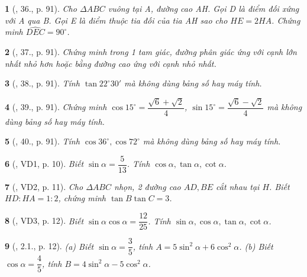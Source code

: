 \documentclass{article}
\newtheorem{baitoan}{}
\begin{document}
\begin{baitoan}[\cite{Binh_Toan_9_tap_1}, 36., p. 91]
	Cho $\Delta ABC$ vuông tại A, đường cao AH. Gọi D là điểm đối xứng với A qua B. Gọi E là điểm thuộc tia đối của tia AH sao cho $HE = 2HA$. Chứng minh $\widehat{DEC} = 90^\circ$.
\end{baitoan}

\begin{baitoan}[\cite{Binh_Toan_9_tap_1}, 37., p. 91]
	Chứng minh trong 1 tam giác, đường phân giác ứng với cạnh lớn nhất nhỏ hơn hoặc bằng đường cao ứng với cạnh nhỏ nhất.
\end{baitoan}

\begin{baitoan}[\cite{Binh_Toan_9_tap_1}, 38., p. 91]
	Tính $\tan22^\circ30'$ mà không dùng bảng số hay máy tính.
\end{baitoan}

\begin{baitoan}[\cite{Binh_Toan_9_tap_1}, 39., p. 91]
	Chứng minh $\cos15^\circ = \dfrac{\sqrt{6} + \sqrt{2}}{4}$, $\sin15^\circ = \dfrac{\sqrt{6} - \sqrt{2}}{4}$ mà không dùng bảng số hay máy tính.
\end{baitoan}

\begin{baitoan}[\cite{Binh_Toan_9_tap_1}, 40., p. 91]
	Tính $\cos36^\circ,\cos72^\circ$ mà không dùng bảng số hay máy tính.
\end{baitoan}

\begin{baitoan}[\cite{TLCT_THCS_Toan_9_hinh_hoc}, VD1, p. 10]
	Biết $\sin\alpha = \dfrac{5}{13}$. Tính $\cos\alpha,\tan\alpha,\cot\alpha$.
\end{baitoan}

\begin{baitoan}[\cite{TLCT_THCS_Toan_9_hinh_hoc}, VD2, p. 11]
	Cho $\Delta ABC$ nhọn, 2 đường cao $AD,BE$ cắt nhau tại $H$. Biết $HD:HA = 1:2$, chứng minh $\tan B\tan C = 3$.
\end{baitoan}

\begin{baitoan}[\cite{TLCT_THCS_Toan_9_hinh_hoc}, VD3, p. 12]
	Biết $\sin\alpha\cos\alpha = \dfrac{12}{25}$. Tính $\sin\alpha,\cos\alpha,\tan\alpha,\cot\alpha$.
\end{baitoan}

\begin{baitoan}[\cite{TLCT_THCS_Toan_9_hinh_hoc}, 2.1., p. 12]
	(a) Biết $\sin\alpha = \dfrac{3}{5}$, tính $A = 5\sin^2\alpha + 6\cos^2\alpha$. (b) Biết $\cos\alpha = \dfrac{4}{5}$, tính $B = 4\sin^2\alpha - 5\cos^2\alpha$.
\end{baitoan}
\end{document}
